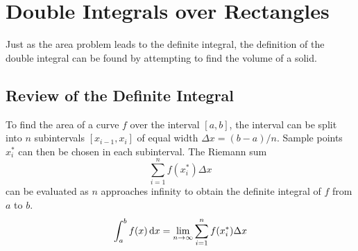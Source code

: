 \documentclass[../Calculus \Roman{3}.tex]{subfiles}
\begin{document}
	\section{Double Integrals over Rectangles}
		Just as the area problem leads to the definite integral, the definition of the double integral can be found by attempting to find the volume of a solid.
		\subsection*{Review of the Definite Integral}
			To find the area of a curve $f$ over the interval $[a, b]$, the interval can be split into $n$ subintervals $[x_{i - 1}, x_i]$ of equal width $\Delta x = (b - a)/n$. Sample points $x_i^*$ can then be chosen in each subinterval. The Riemann sum
				\[\sum_{i = 1}^n f(x_i^*)\Delta x\]
				can be evaluated as $n$ approaches infinity to obtain the definite integral of $f$ from $a$ to $b$.
				\[\int_a^b f(x)\,\mathrm{d} x = \lim_{n \to \infty}\sum_{i = 1}^n f(x_i^*)\Delta x\]
\end{document}

